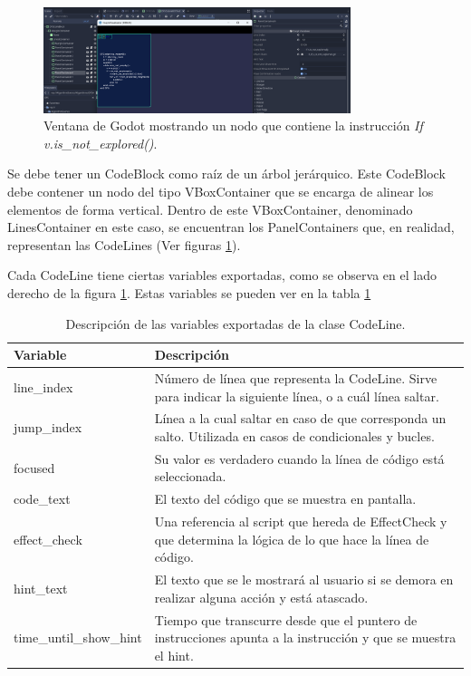 \begin{figure}[!h]
	\centering
	\includegraphics[width=0.8\textwidth]{imagenes/DFS_if_v_is_not_explored.png}
	\caption{Ventana de Godot mostrando un nodo que contiene la instrucción \emph{If v.is\_not\_explored()}.}
	\label{Godot_v_is_not_explored}
\end{figure}

Se debe tener un CodeBlock como raíz de un árbol jerárquico. Este CodeBlock debe contener un nodo del tipo VBoxContainer que se encarga de alinear los elementos de forma vertical. Dentro de este VBoxContainer, denominado LinesContainer en este caso, se encuentran los PanelContainers que, en realidad, representan las CodeLines (Ver figuras \ref{Godot_v_is_not_explored}).

Cada CodeLine tiene ciertas variables exportadas, como se observa en el lado derecho de la figura \ref{Godot_v_is_not_explored}. Estas variables se pueden ver en la tabla \ref{table_code_line_variables}

\begin{table}[!h]
    \centering
    \begin{tabular}{|l|p{}|}
        \hline
        \textbf{Variable} & \textbf{Descripción} \\
        \hline
        line\_index & Número de línea que representa la CodeLine. Sirve para indicar la siguiente línea, o a cuál línea saltar. \\
        \hline
        jump\_index  & Línea a la cual saltar en caso de que corresponda un salto. Utilizada en casos de condicionales y bucles. \\
        \hline
        focused & Su valor es verdadero cuando la línea de código está seleccionada. \\
        \hline
		code\_text & El texto del código que se muestra en pantalla. \\
        \hline
        effect\_check & Una referencia al script que hereda de EffectCheck y que determina la lógica de lo que hace la línea de código. \\
        \hline
        hint\_text  & El texto que se le mostrará al usuario si se demora en realizar alguna acción y está atascado. \\
        \hline
        time\_until\_show\_hint & Tiempo que transcurre desde que el puntero de instrucciones apunta a la instrucción y que se muestra el hint. \\
        \hline
    \end{tabular}
    \caption{Descripción de las variables exportadas de la clase CodeLine.}
    \label{table_code_line_variables}
\end{table}


